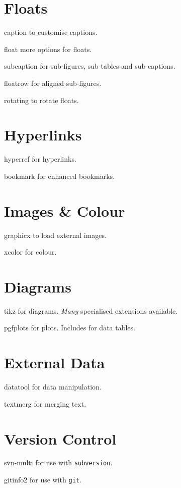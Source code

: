 \documentclass[a4paper,welsh,british,twocolumn]{article}
\begin{document}
\section{Floats}
\begin{pkgdescription}
  \item[caption] to customise captions.
  \item[float] more options for floats.
  \item[subcaption] for sub-figures, sub-tables and sub-captions.
  \item[floatrow] for aligned sub-figures.
  \item[rotating] to rotate floats.
\end{pkgdescription}
\section{Hyperlinks}
\begin{pkgdescription}
  \item[hyperref] for hyperlinks.
  \item[bookmark] for enhanced bookmarks.
\end{pkgdescription}
\section{Images \& Colour}
\begin{pkgdescription}
  \item[graphicx] to load external images.
  \item[xcolor] for colour.
\end{pkgdescription}
\section{Diagrams}
\begin{pkgdescription}
  \item[tikz] for diagrams.
  \emph{Many} specialised extensions available.
  \item[pgfplots] for plots.
  Includes  for data tables.
\end{pkgdescription}
\section{External Data}
\begin{pkgdescription}
  \item[datatool] for data manipulation.
  \item[textmerg] for merging text.
\end{pkgdescription}
\section{Version Control}
\begin{pkgdescription}
  \item[svn-multi] for use with \verb|subversion|.
  \item[gitinfo2] for use with \verb|git|.
\end{pkgdescription}
\end{document}
